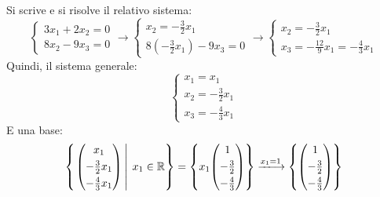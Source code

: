 \documentclass[a4paper]{article}
\makeatletter
\newenvironment{rowequmat}[1]{\left(\array{@{}#1@{}}}{\endarray\right)}
\makeatother
\begin{document}
	Si scrive e si risolve il relativo sistema:
	\begin{equation*}
		\begin{cases}
			3x_{1} + 2x_{2} = 0 \\
			8x_{2} - 9x_{3} = 0
		\end{cases}
		\longrightarrow
		\begin{cases}
			x_{2} = -\frac{3}{2}x_{1} \\
			8\left(-\frac{3}{2}x_{1}\right) - 9x_{3} = 0
		\end{cases}
		\longrightarrow
		\begin{cases}
			x_{2} = -\frac{3}{2}x_{1} \\
			x_{3} = -\frac{12}{9}x_{1} = -\frac{4}{3}x_{1}
		\end{cases}
	\end{equation*}
	Quindi, il sistema generale:
	\begin{equation*}
		\begin{cases}
			x_{1} = x_{1} \\
			x_{2} = -\frac{3}{2}x_{1} \\
			x_{3} = -\frac{4}{3}x_{1}
		\end{cases}
	\end{equation*}
	E una base:
	\begin{equation*}
		\left\{\left.\begin{rowequmat}{c}
			x_{1} \\ [.3em]
			-\frac{3}{2}x_{1} \\ [.3em]
			-\frac{4}{3}x_{1}
		\end{rowequmat} \: \right| \: x_{1} \in \mathbb{R}\right\} = \left\{x_{1}\begin{rowequmat}{c}
			1 \\ [.3em]
			-\frac{3}{2} \\ [.3em]
			-\frac{4}{3}
		\end{rowequmat}\right\}
		\xlongrightarrow{x_{1} = 1}
		\left\{\begin{rowequmat}{c}
			1 \\ [.3em]
			-\frac{3}{2} \\ [.3em]
			-\frac{4}{3}
		\end{rowequmat}\right\}
	\end{equation*}\newpage
	
\end{document}
